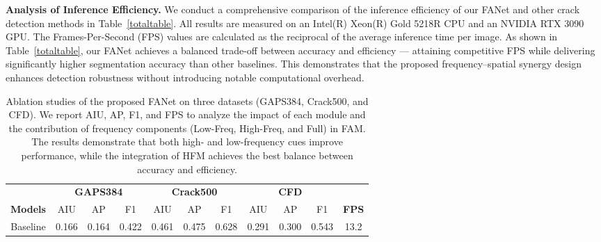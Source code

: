 \documentclass[journal]{IEEEtran}
\begin{document}
\textbf{Analysis of Inference Efficiency.}  
We conduct a comprehensive comparison of the inference efficiency of our FANet and other crack detection methods in Table~\ref{totaltable}.  
All results are measured on an Intel(R) Xeon(R) Gold 5218R CPU and an NVIDIA RTX 3090 GPU.  
The Frames-Per-Second (FPS) values are calculated as the reciprocal of the average inference time per image.  
As shown in Table~\ref{totaltable}, our FANet achieves a balanced trade-off between accuracy and efficiency — attaining competitive FPS while delivering significantly higher segmentation accuracy than other baselines.  
This demonstrates that the proposed frequency–spatial synergy design enhances detection robustness without introducing notable computational overhead.




\begin{table}[]
\centering
\caption{{Ablation studies of the proposed FANet on three datasets (GAPS384, Crack500, and CFD).
We report AIU, AP, F1, and FPS to analyze the impact of each module and the contribution of frequency components (Low-Freq, High-Freq, and Full) in FAM.
The results demonstrate that both high- and low-frequency cues improve performance, while the integration of HFM achieves the best balance between accuracy and efficiency.}}
\begin{tabular}{@{}c|ccc|ccc|ccc|c@{}}
\toprule
                                  & \multicolumn{3}{c|}{\textbf{GAPS384}}                                                      & \multicolumn{3}{c|}{\textbf{Crack500}}                                                     & \multicolumn{3}{c|}{\textbf{CFD}}                                                          &                                \\ \cmidrule(lr){2-10}
\multirow{-2}{*}{\textbf{Models}} & AIU                          & AP                           & F1                           & AIU                          & AP                           & F1                           & AIU                          & AP                           & F1                           & \multirow{-2}{*}{\textbf{FPS}} \\ \midrule
Baseline                          & 0.166                        & 0.164                        & 0.422                        & 0.461                        & 0.475                        & 0.628                        & 0.291                        & 0.300                          & 0.543                        & 13.2                           \\

\end{tabular}
\end{table}
\end{document}
